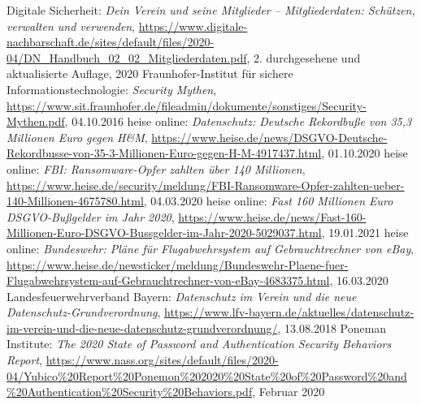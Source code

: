 \begin{frame}
{\begin{thebibliography}{LFVByXX}
     Digitale Sicherheit: \textit{Dein Verein und seine Mitglieder -- Mitgliederdaten: Schützen, verwalten und verwenden}, \href{https://www.digitale-nachbarschaft.de/sites/default/files/2020-04/DN_Handbuch_02_02_Mitgliederdaten.pdf}{\url{https://www.digitale-nachbarschaft.de/sites/default/files/2020-04/DN_Handbuch_02_02_Mitgliederdaten.pdf}}, 2. durchgesehene und aktualisierte Auflage, 2020
     Fraunhofer-Institut für sichere Informationstechnologie: \textit{Security Mythen},  \href{https://www.sit.fraunhofer.de/fileadmin/dokumente/sonstiges/Security-Mythen.pdf}{\url{https://www.sit.fraunhofer.de/fileadmin/dokumente/sonstiges/Security-Mythen.pdf}}, 04.10.2016
     heise online: \textit{Datenschutz: Deutsche Rekordbuße von 35,3 Millionen Euro gegen H\&M}, \href{https://www.heise.de/news/DSGVO-Deutsche-Rekordbusse-von-35-3-Millionen-Euro-gegen-H-M-4917437.html}{\url{https://www.heise.de/news/DSGVO-Deutsche-Rekordbusse-von-35-3-Millionen-Euro-gegen-H-M-4917437.html}}, 01.10.2020
     heise online: \textit{FBI: Ransomware-Opfer zahlten über 140 Millionen}, \href{https://www.heise.de/security/meldung/FBI-Ransomware-Opfer-zahlten-ueber-140-Millionen-4675780.html}{\url{https://www.heise.de/security/meldung/FBI-Ransomware-Opfer-zahlten-ueber-140-Millionen-4675780.html}}, 04.03.2020
     heise online: \textit{Fast 160 Millionen Euro DSGVO-Bußgelder im Jahr 2020}, \href{https://www.heise.de/news/Fast-160-Millionen-Euro-DSGVO-Bussgelder-im-Jahr-2020-5029037.html}{\url{https://www.heise.de/news/Fast-160-Millionen-Euro-DSGVO-Bussgelder-im-Jahr-2020-5029037.html}}, 19.01.2021
     heise online: \textit{Bundeswehr: Pläne für Flugabwehrsystem auf Gebrauchtrechner von eBay}, \href{https://www.heise.de/newsticker/meldung/Bundeswehr-Plaene-fuer-Flugabwehrsystem-auf-Gebrauchtrechner-von-eBay-4683375.html}{\url{https://www.heise.de/newsticker/meldung/Bundeswehr-Plaene-fuer-Flugabwehrsystem-auf-Gebrauchtrechner-von-eBay-4683375.html}}, 16.03.2020
     Landesfeuerwehrverband Bayern: \textit{Datenschutz im Verein und die neue Datenschutz-Grundverordnung},  \href{https://www.lfv-bayern.de/aktuelles/datenschutz-im-verein-und-die-neue-datenschutz-grundverordnung/}{\url{https://www.lfv-bayern.de/aktuelles/datenschutz-im-verein-und-die-neue-datenschutz-grundverordnung/}}, 13.08.2018
     Poneman Institute: \textit{The 2020 State of Password and Authentication Security Behaviors Report}, \href{https://www.nass.org/sites/default/files/2020-04/Yubico\%20Report\%20Ponemon\%202020\%20State\%20of\%20Password\%20and\%20Authentication\%20Security\%20Behaviors.pdf}{\url{https://www.nass.org/sites/default/files/2020-04/Yubico\%20Report\%20Ponemon\%202020\%20State\%20of\%20Password\%20and\%20Authentication\%20Security\%20Behaviors.pdf}}, Februar 2020

\end{thebibliography}}
\end{frame}

